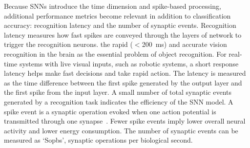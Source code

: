Because SNNs introduce the time dimension and spike-based processing, additional performance metrics become relevant in addition to classification accuracy: recognition latency and the number of synaptic events.
Recognition latency measures how fast spikes are conveyed through the layers of network to trigger the recognition neurons.
\protect{}
\citet{dicarlo2012does}\protect{} the rapid ($<$200~ms) and accurate vision recognition in the brain as the essential problem of object recognition.
For real-time systems with live visual inputs, such as robotic systems, a short response latency helps make fast decisions and take rapid action.
The latency is measured as the time difference between the first spike generated by the output layer and the first spike from the input layer.
A small number of total synaptic events generated by a recognition task indicates the efficiency of the SNN model.
A spike event is a synaptic operation evoked when one action potential is transmitted through one synapse~\citep{sharp2012power}.
Fewer spike events imply lower overall neural activity and lower energy consumption.
The number of synaptic events can be measured as `Sopbs', synaptic operations per biological second.

